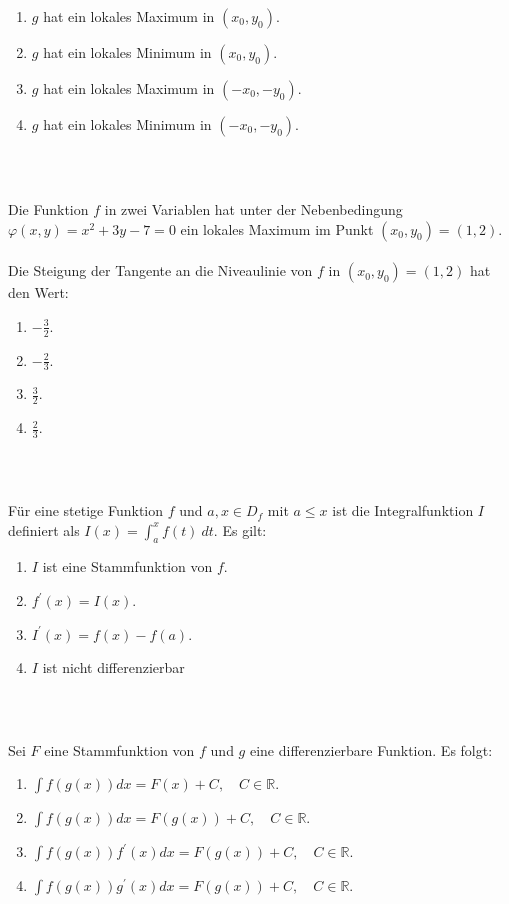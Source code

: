 \renewcommand{\labelenumi}{(\alph{enumi})}
\begin{enumerate}
\item $ g $ hat ein lokales Maximum in $ (x_0,y_0) $.
\item $ g $ hat ein lokales Minimum in $ (x_0,y_0) $.
\item
$ g $ hat ein lokales Maximum in $ (-x_0,-y_0) $.
\item
$ g $ hat ein lokales Minimum in $ (-x_0,-y_0) $.
\end{enumerate}
\ \\
\subsection*{}
Die Funktion $ f $ in zwei Variablen hat unter der Nebenbedingung $ \varphi(x,y) = x^2 + 3 y - 7 = 0 $ ein lokales Maximum im Punkt $ (x_0,y_0) = (1,2) $.\\
\\
Die Steigung der Tangente  an die Niveaulinie von $ f $ in $ (x_0,y_0) = (1,2) $ hat den Wert:
\renewcommand{\labelenumi}{(\alph{enumi})}
\begin{enumerate}
\item 
$-\frac{3}{2}$.
\item 
$-\frac{2}{3}$.
\item 
$\frac{3}{2}$.
\item
$\frac{2}{3}$.
\end{enumerate}
\ \\
\subsection*{}
Für eine stetige Funktion $ f $ und $ a,x \in D_f $ mit $ a \leq x  $ ist die Integralfunktion $ I $ definiert als $ I(x) = \int_a^x f(t) \ dt $. Es gilt:
\renewcommand{\labelenumi}{(\alph{enumi})}
\begin{enumerate}
	\item 
	$ I $ ist eine Stammfunktion von $ f $.
	\item
	$ f^\prime(x) = I(x) $.
	\item
	$ I^\prime(x) = f(x) - f(a) $.
	\item
	$ I $ ist nicht differenzierbar
\end{enumerate}
\ \\
\subsection*{}
Sei $ F $ eine Stammfunktion von $ f $ und $ g $ eine differenzierbare Funktion.
Es folgt:
\renewcommand{\labelenumi}{(\alph{enumi})}
\begin{enumerate}
\item 
$ \int f(g(x)) dx = F(x) +C, \quad C \in \mathbb{R} $.
\item 
$ \int f(g(x)) dx = F(g(x)) +C, \quad C \in \mathbb{R} $.
\item 
$ \int f(g(x)) f^\prime(x) dx = F(g(x)) +C, \quad C \in \mathbb{R} $.
\item 
$ \int f(g(x)) g^\prime(x) dx = F(g(x)) +C, \quad C \in \mathbb{R} $.
\end{enumerate}
\ \\

